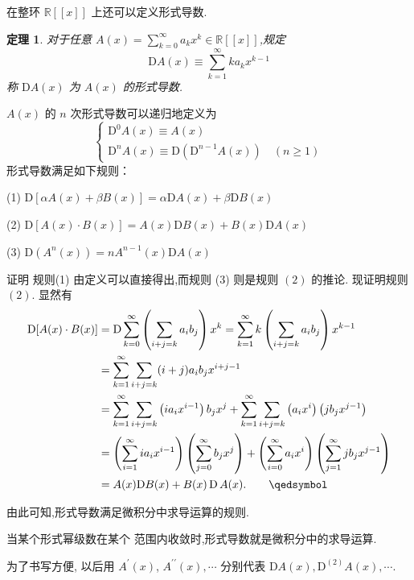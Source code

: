\documentclass[punct]{ctexbeamer}
\newtheorem{thm}{定理}[section]
\def\pf{\noindent {\bf 证明\ }}
\begin{document}
\begin{frame}
    在整环 $\mathbb{R}[[x]]$ 上还可以定义形式导数.
	\begin{thm}
		对于任意 $A(x)=\sum_{k=0}^{\infty} a_{k} x^{k} \in \mathbb{R}[[x]]$,规定$$
		\mathrm{D} A(x) \equiv \sum_{k=1}^{\infty} k a_{k} x^{k-1}
		$$
		称 $\mathrm{D} A(x)$ 为 $A(x)$ 的形式导数.
	\end{thm}
$A(x)$ 的 $n$ 次形式导数可以递归地定义为
$$
\left\{\begin{array}{l}
\mathrm{D}^{0} A(x) \equiv A(x) \\
\mathrm{D}^{n} A(x) \equiv \mathrm{D}\left(\mathrm{D}^{n-1} A(x)\right) \quad(n \geqslant 1)
\end{array}\right.
$$
形式导数满足如下规则：

(1) $\mathrm{D}[\alpha A(x)+\beta B(x)]=\alpha \mathrm{D} A(x)+\beta \mathrm{D} B(x)$

(2) $\mathrm{D}[A(x) \cdot B(x)]=A(x) \mathrm{D} B(x)+B(x) \mathrm{D} A(x)$

(3) $\mathrm{D}\left(A^{n}(x)\right)=n A^{n-1}(x) \mathrm{D} A(x)$
\end{frame}

\begin{frame}
\pf 证明 规则(1) 由定义可以直接得出,而规则 (3) 则是规则 $(2)$ 的推论. 现证明规则 $(2)$. 显然有
$$
\begin{aligned}
\mathrm{D}[A(x) \cdot B(x)] &=\mathrm{D} \sum_{k=0}^{\infty}\left(\sum_{i+j=k} a_{i} b_{j}\right) x^{k}=\sum_{k=1}^{\infty} k\left(\sum_{i+j=k} a_{i} b_{j}\right) x^{k-1} \\
&=\sum_{k=1}^{\infty} \sum_{i+j=k}(i+j) a_{i} b_{j} x^{i+j-1} \\
&=\sum_{k=1}^{\infty} \sum_{i+j=k}\left(i a_{i} x^{i-1}\right) b_{j} x^{j}+\sum_{k=1}^{\infty} \sum_{i+j=k}\left(a_{i} x^{i}\right)\left(j b_{j} x^{j-1}\right) \\
&=\left(\sum_{i=1}^{\infty} i a_{i} x^{i-1}\right)\left(\sum_{j=0}^{\infty} b_{j} x^{j}\right)+\left(\sum_{i=0}^{\infty} a_{i} x^{i}\right)\left(\sum_{j=1}^{\infty} j b_{j} x^{j-1}\right) \\
&=A(x) \mathrm{D} B(x)+B(x) \operatorname{D} A(x) . \qquad   \qedsymbol
\end{aligned}
$$

由此可知,形式导数满足微积分中求导运算的规则.

当某个形式幂级数在某个 范围内收敛时,形式导数就是微积分中的求导运算.

为了书写方便, 以后用 $A^{\prime}(x)$, $A^{\prime \prime}(x), \cdots$ 分别代表 $\mathrm{D} A(x), \mathrm{D}^{(2)} A(x), \cdots .$
\end{frame}
\end{document}
